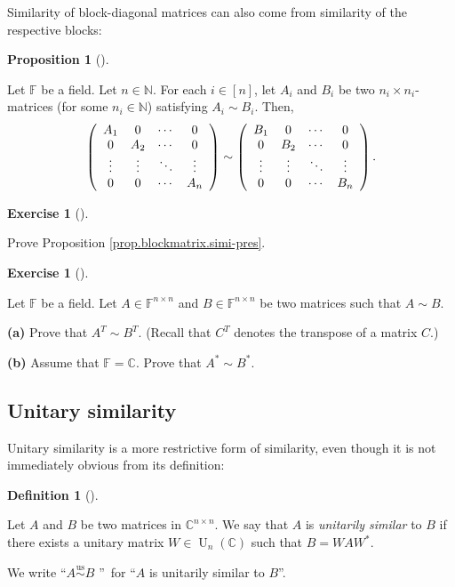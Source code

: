 \documentclass[numbers=enddot,12pt,final,onecolumn,notitlepage]{scrartcl}%
\newcounter{exer}
\numberwithin{exer}{subsection}
\theoremstyle{definition}
\newtheorem{prop}[theo]{Proposition}
\newenvironment{proposition}[1][]
{\begin{prop}[#1]\begin{leftbar}}
{\end{leftbar}\end{prop}}
\newtheorem{defi}[theo]{Definition}
\newenvironment{definition}[1][]
{\begin{defi}[#1]\begin{leftbar}}
{\end{leftbar}\end{defi}}
\newtheorem{exmp}[exer]{Exercise}
\newenvironment{exercise}[1][]
{\begin{exmp}[#1]\begin{leftbar}}
{\end{leftbar}\end{exmp}}
\begin{document}
Similarity of block-diagonal matrices can also come from similarity of the
respective blocks:

\begin{proposition}
\label{prop.blockmatrix.simi-pres}Let $\mathbb{F}$ be a field. Let
$n\in\mathbb{N}$. For each $i\in\left[  n\right]  $, let $A_{i}$ and $B_{i}$
be two $n_{i}\times n_{i}$-matrices (for some $n_{i}\in\mathbb{N}$) satisfying
$A_{i}\sim B_{i}$. Then,%
\[
\left(
\begin{array}
[c]{cccc}%
A_{1} & 0 & \cdots & 0\\
0 & A_{2} & \cdots & 0\\
\vdots & \vdots & \ddots & \vdots\\
0 & 0 & \cdots & A_{n}%
\end{array}
\right)  \sim\left(
\begin{array}
[c]{cccc}%
B_{1} & 0 & \cdots & 0\\
0 & B_{2} & \cdots & 0\\
\vdots & \vdots & \ddots & \vdots\\
0 & 0 & \cdots & B_{n}%
\end{array}
\right)  .
\]

\end{proposition}

\begin{exercise}
\label{exe.blockmatrix.simi-pres} Prove Proposition
\ref{prop.blockmatrix.simi-pres}.
\end{exercise}

\begin{exercise}
 Let $\mathbb{F}$ be a field. Let $A\in\mathbb{F}^{n\times n}$ and
$B\in\mathbb{F}^{n\times n}$ be two matrices such that $A\sim B$. \medskip

\textbf{(a)} Prove that $A^{T}\sim B^{T}$. (Recall that $C^{T}$ denotes the
transpose of a matrix $C$.) \medskip

\textbf{(b)} Assume that $\mathbb{F}=\mathbb{C}$. Prove that $A^{\ast}\sim
B^{\ast}$.
\end{exercise}

\subsection{Unitary similarity}

Unitary similarity is a more restrictive form of similarity, even though it is
not immediately obvious from its definition:

\begin{definition}
\label{def.schurtri.unisim.def}Let $A$ and $B$ be two matrices in
$\mathbb{C}^{n\times n}$. We say that $A$ is \emph{unitarily similar} to $B$
if there exists a unitary matrix $W\in\operatorname*{U}\nolimits_{n}\left(
\mathbb{C}\right)  $ such that $B=WAW^{\ast}$.

We write \textquotedblleft$A\overset{\operatorname*{us}}{\sim}B$%
\textquotedblright\ for \textquotedblleft$A$ is unitarily similar to
$B$\textquotedblright.
\end{definition}
\end{document}
